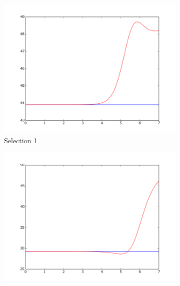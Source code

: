 \documentclass{article}
\begin{document}

\begin{figure}[!ht]
    \centering
    \begin{subfigure}[b]{0.4\textwidth}
        \includegraphics[width=\textwidth]{Part2/II221.png}
        \caption{Selection 1}
        \label{fig:II221}
    \end{subfigure}
    \begin{subfigure}[b]{0.4\textwidth}
        \includegraphics[width=\textwidth]{Part2/II222.png}

\end{subfigure}
\end{figure}
\end{document}
